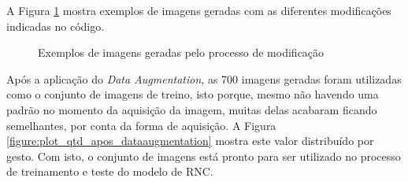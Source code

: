 \par A Figura \ref{figure:gestos_gerados_no_pipeline} mostra exemplos de imagens geradas com as diferentes modificações indicadas no código.

\begin{figure}[H]%
    \centering
    \caption{Exemplos de imagens geradas pelo processo de modificação}
    \qquad
    \qquad
    \qquad
    \label{figure:gestos_gerados_no_pipeline}
\end{figure}

\par Após a aplicação do \textit{Data Augmentation}, as 700 imagens geradas foram utilizadas como o conjunto de imagens de treino, isto porque, mesmo não havendo uma padrão no momento da aquisição da imagem, muitas delas acabaram ficando semelhantes, por conta da forma de aquisição. A Figura \ref{figure:plot_qtd_apos_dataaugmentation} mostra este valor distribuído por gesto. Com isto, o conjunto de imagens está pronto para ser utilizado no processo de treinamento e teste do modelo de RNC.

